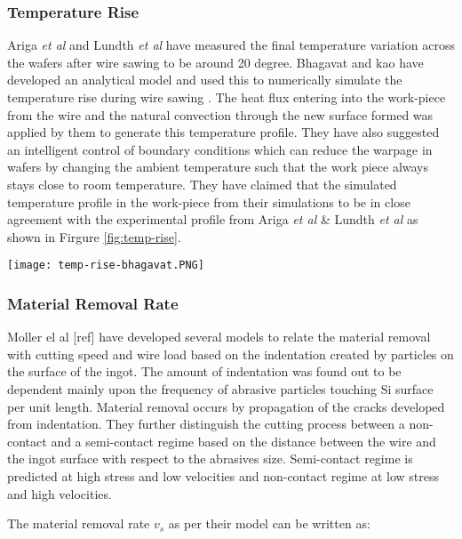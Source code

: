 \subsubsection{Temperature Rise}
Ariga \textit{et al}  \cite{ariga2003wire} and Lundth \textit{et al} \cite{} have measured the final temperature variation across the wafers after wire sawing to be around 20 degree. Bhagavat and kao \cite{} have developed an analytical model and used this to numerically simulate the temperature rise during wire sawing \cite{}. The heat flux entering into the work-piece from the wire and the natural convection through the new surface formed was applied by them to generate this temperature profile. They have also suggested an intelligent control of boundary conditions which can reduce the warpage in wafers by changing the ambient temperature such that the work piece always stays close to room temperature. They have claimed that the simulated temperature profile in the work-piece from their simulations to be in close agreement with the experimental profile from Ariga \textit{et al} \& Lundth \textit{et al} as shown in Firgure \ref{fig:temp-rise}.
\newline
\noindent
\begin{minipage}[c]{\textwidth}
\centering
        \captionsetup{type=figure}
        \texttt{[image: temp-rise-bhagavat.PNG]}
        \label{fig:temp-rise}
 \end{minipage}

\subsubsection{Material Removal Rate}
Moller el al [ref] have developed several models to relate the material removal with cutting speed and wire load based on the indentation created by particles on the surface of the ingot. The amount of indentation was found out to be dependent mainly upon the frequency of abrasive particles touching Si surface per unit length. Material removal occurs by propagation of the cracks developed from indentation. They further distinguish the cutting process between a non-contact and a semi-contact regime based on the distance between the wire and the ingot surface with respect to the abrasives size. Semi-contact regime is predicted at high stress and low velocities and non-contact regime at low stress and high velocities.

The material removal rate $v_{s}$ as per their model can be written as:

